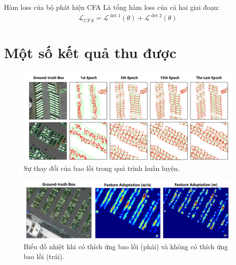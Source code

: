 \documentclass[11pt]{beamer}
\theoremstyle{definition}
\theoremstyle{plain}
\theoremstyle{plain}
\theoremstyle{remark}
\begin{document}
	\begin{frame}{Hàm loss của bộ phát hiện CFA}
		Là tổng hàm loss của cả hai giai đoạn:
		\begin{align}
			\mathcal{L}_{CFA} = \mathcal{L}^{\operatorname{det} 1}(\theta)+\mathcal{L}^{\operatorname{det} 2}(\theta)
		\end{align}
		
	\end{frame}
	\section{Một số kết quả thu được}
	\begin{frame}
		
\begin{figure}
	\centering
	\includegraphics[width=1\linewidth]{Figures/convex_hull_evaluation_when_training}
	\caption{Sự thay đổi của bao lồi trong quá trình huấn luyện.}
	\label{fig:convexhullevaluationwhentraining}
\end{figure}
\end{frame}
	\begin{frame}
\begin{figure}
	\centering
	\includegraphics[width=1\linewidth]{Figures/heat_map_comparision_of_CFA}
	\caption{Biểu đồ nhiệt khi có thích ứng bao lồi (phải) và không có thích ứng bao lồi (trái).}
	\label{fig:heatmapcomparisionofcfa}
\end{figure}
		
	\end{frame}
\end{document}
